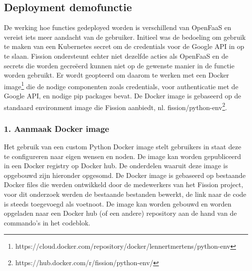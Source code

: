 \subsection{Deployment demofunctie}
De werking hoe functies gedeployed worden is verschillend van OpenFaaS en vereist iets meer aandacht van de gebruiker. Initieel was de bedoeling om gebruik te maken van een Kubernetes secret om de credentials voor de Google API in op te slaan. Fission ondersteunt echter niet dezelfde acties als OpenFaaS en de secrets die worden gecreëerd kunnen  niet op de gewenste manier in de functie worden gebruikt. Er wordt geopteerd om daarom te werken met een Docker image\footnote{https://cloud.docker.com/repository/docker/lennertmertens/python-env} die de nodige componenten zoals credentials, voor authenticatie met de Google API, en nodige pip packages bevat. De Docker image is gebaseerd op de standaard environment image die Fission aanbiedt, nl. fission/python-env\footnote{https://hub.docker.com/r/fission/python-env/}.

\subsubsection{1. Aanmaak Docker image}
Het gebruik van een custom Python Docker image stelt gebruikers in staat deze te configureren naar eigen wensen en noden. De image kan worden gepubliceerd in een Docker registry op Docker hub. De onderdelen waaruit deze image is opgebouwd zijn hieronder opgesomd. De Docker image is gebaseerd op bestaande Docker files die werden ontwikkeld door de medewerkers van het Fission project, voor dit onderzoek werden de bestaande bestanden bewerkt, de link naar de code is steeds toegevoegd als voetnoot. De image kan worden gebouwd en worden opgeladen naar een Docker hub (of een andere) repository aan de hand van de commando's in het codeblok.

